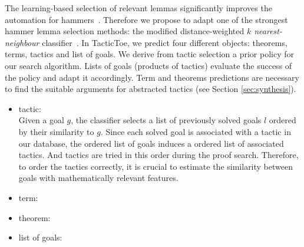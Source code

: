 \documentclass[runningheads,a4paper,draft]{svjour3}
\def\sml{\textsf{SML}\xspace}
\def\tactictoe{\textsf{TacticToe}\xspace}
\begin{document}
The learning-based selection of relevant lemmas significantly improves the 
automation for hammers~\cite{BlanchetteGKKU16}. Therefore we propose to adapt 
one of the strongest hammer lemma selection 
methods: the modified distance-weighted \emph{$k$ nearest-neighbour} 
classifier~\cite{ckju-pxtp13,DudaniS76}.
In \tactictoe, we predict four different objects: theorems, terms, tactics and 
list of goals. We derive from tactic selection a prior policy for 
our search algorithm. Lists of goals (products of tactics) evaluate the success 
of the policy and adapt it accordingly. Term and theorems predictions are 
necessary to find the suitable arguments for abstracted tactics (see Section 
\ref{sec:synthesis}).




\begin{itemize}
\item tactic:\\
Given a goal $g$, the classifier selects a list of previously solved goals $l$
ordered by their similarity to $g$. Since each solved goal is associated 
with a tactic in our database, the ordered list of goals induces a ordered  
list of associated tactics. And tactics are tried in this order during the 
proof search. Therefore, to order the tactics correctly, it is crucial to 
estimate the similarity between goals with mathematically relevant features.
\item term:\\


\item theorem:\\


\item list of goals:\\

\end{itemize}



\end{document}
